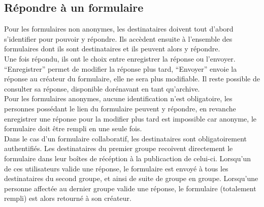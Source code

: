 \documentclass{sigplanconf}
\begin{document}
\subsection{Répondre à un formulaire}
Pour les formulaires non anonymes, les destinataires doivent tout d’abord s’identifier pour pouvoir y répondre. Ils accèdent ensuite à l’ensemble des formulaires dont ils sont destinataires et ils peuvent alors y répondre. \\
Une fois répondu, ils ont le choix entre enregistrer la réponse ou l'envoyer. “Enregistrer” permet de modifier la réponse plus tard, “Envoyer” envoie la réponse au créateur du formulaire, elle ne sera plus modifiable. Il reste possible de consulter sa réponse, disponible dorénavant en tant qu'archive.\\
Pour les formulaires anonymes, aucune identification n’est obligatoire, les personnes possédant le lien du formulaire peuvent y répondre, en revanche enregistrer une réponse pour la modifier plus tard est impossible car anonyme, le formulaire doit être rempli en une seule fois.\\

Dans le cas d'un formulaire collaboratif, les destinataires sont obligatoirement authentifiés. Les destinataires du premier groupe recoivent directement le formulaire dans leur boîtes de récéption à la publicaction de celui-ci. Lorsqu'un de ces utilisateurs valide une réponse, le formulaire est envoyé à tous les destinataires du second groupe, et ainsi de suite de groupe en groupe. Lorsqu'une personne affectée au dernier groupe valide une réponse, le formulaire (totalement rempli) est alors retourné à son créateur.\\
\end{document}
